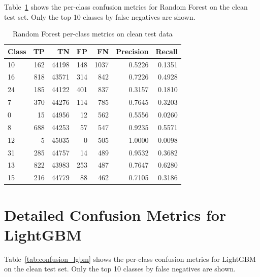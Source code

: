 \documentclass[12pt,a4paper,oneside]{report}
\begin{document}
\begin{appendices}
Table~\ref{tab:confusion_rf} shows the per-class confusion metrics for Random Forest on the clean test set. Only the top 10 classes by false negatives are shown.

\begin{table}[H]
    \centering
    \caption[Random Forest confusion metrics (top 10)]{Random Forest per-class metrics on clean test data}\label{tab:confusion_rf}
    \begin{tabular}{lrrrrrr}
        \toprule
        Class & TP & TN & FP & FN & Precision & Recall \\
        \midrule
        10 & 162 & 44198 & 148 & 1037 & 0.5226 & 0.1351 \\
        16 & 818 & 43571 & 314 & 842  & 0.7226 & 0.4928 \\
        24 & 185 & 44122 & 401 & 837  & 0.3157 & 0.1810 \\
        7  & 370 & 44276 & 114 & 785  & 0.7645 & 0.3203 \\
        0  & 15  & 44956 & 12  & 562  & 0.5556 & 0.0260 \\
        8  & 688 & 44253 & 57  & 547  & 0.9235 & 0.5571 \\
        12 & 5   & 45035 & 0   & 505  & 1.0000 & 0.0098 \\
        31 & 285 & 44757 & 14  & 489  & 0.9532 & 0.3682 \\
        13 & 822 & 43983 & 253 & 487  & 0.7647 & 0.6280 \\
        15 & 216 & 44779 & 88  & 462  & 0.7105 & 0.3186 \\
        \bottomrule
    \end{tabular}
\end{table}

\section{Detailed Confusion Metrics for LightGBM}

Table~\ref{tab:confusion_lgbm} shows the per-class confusion metrics for LightGBM on the clean test set. Only the top 10 classes by false negatives are shown.


\end{appendices}
\end{document}
